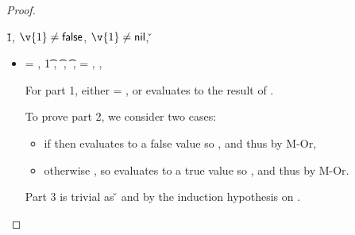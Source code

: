\begin{lemma}
\begin{proof}
\begin{case}[B-IfTrue]
        \opsem {\openv{}} {} {\v{1}},
              ${\v{1}} \not= {\false}$,
              ${\v{1}} \not= {\nil}$,
              \opsem {\openv{}} {} {\v{}}

  \begin{itemize}
    \item[]
      \begin{subcase}[T-If]
  \ep{} = { {} {}},
  \judgementrewrite {\propenv{}} {} {\t{1}} { {}}
                 {}
                 {},
                 {} {\t{}} { {}}
                 {\object{}}
                 {},
                 {} {\t{}} { {}}
                 {\object{}}
                 {},
  \e{} = { {} {}},
  ,

              For part 1, either \object{} = \emptyobject{}, or \e{} evaluates to the
              result of .

              To prove part 2, we consider two cases:
              \begin{itemize}
                \item if \isfalseval{\v{}}
                  then  evaluates to a false value so {}, and thus
                  {} by M-Or, 
                \item otherwise
                  \istrueval{\v{}},
                  so  evaluates to a true value so {}, and thus
                  {} by M-Or.
              \end{itemize}

              Part 3 is trivial as
              \opsem {\openv{}} {} {\v{}}
              and {\judgementtwo{}{\v{}}{\t{}}} by the induction hypothesis on {}.

      \end{subcase}
  \end{itemize}
\end{case}


\end{proof}
\end{lemma}
